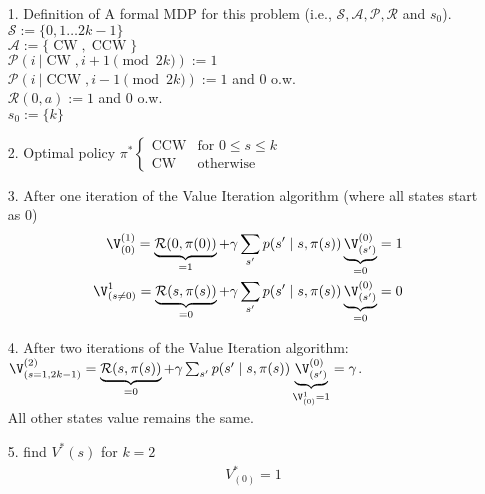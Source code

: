 
\begin{itemize}
\item[1.]Definition of A formal MDP for this problem (i.e., $\mathcal{S} , \mathcal{A} ,\mathcal{P} , \mathcal{R} $ and $s_0$).
\\ $\mathcal{S}:=\{0,1\dots 2k-1\}$
\\$ \mathcal{A}:=\{\operatorname{CW},\operatorname{CCW}\}$
\\ $\mathcal{P}(i\ | \operatorname{CW},i + 1\pmod {2k}):=1$\\
 $\mathcal{P}(i\ | \operatorname{CCW},i - 1\pmod {2k}):=1$ 
and $0$ o.w.
\\ $\mathcal{R}(0,a):=1$ and $0$ o.w.
\\ $s_0:=\{k\}$
\item[2.] Optimal policy $\pi^*
\begin{cases}
\operatorname{CCW} & \text{for } 0\le s \le k\\
\operatorname{CW} & \text{otherwise}
\end{cases}
$
\item[3.] After one iteration of the Value Iteration algorithm (where all states start as 0)
\begin{align*}
\V^{(1)}_{(0)} =  \underbrace{\mathcal{R}(0, \pi(0))}_{=1}+ \gamma \sum_{s'} p(s' \mid s, \pi(s)) \underbrace{ \V^{(0)}_{(s')}}_{=0}=1\\
\V^{1}_{(s\neq 0)} =  \underbrace{\mathcal{R}(s, \pi(s))}_{=0}+ \gamma \sum_{s'} p(s' \mid s, \pi(s))\underbrace{ \V^{(0)}_{(s')}}_{=0}=0
\end{align*}




 
\item[4.]After two iterations of the Value Iteration algorithm: \\
 $\V^{(2)}_{(s=1,2k-1)} =  \underbrace{\mathcal{R}(s, \pi(s))}_{=0}+ \gamma \sum_{s'} p(s' \mid s, \pi(s))\underbrace{ \V^{(0)}_{(s')}}_{\V^1_{(0)}=1}=\gamma$.\\
All other states value  remains the same. 
\item[5.] find $V^*(s)$ for $k=2$
\begin{align*}
&V^*_{(0)}=1\\
\end{align*}

\end{itemize}


